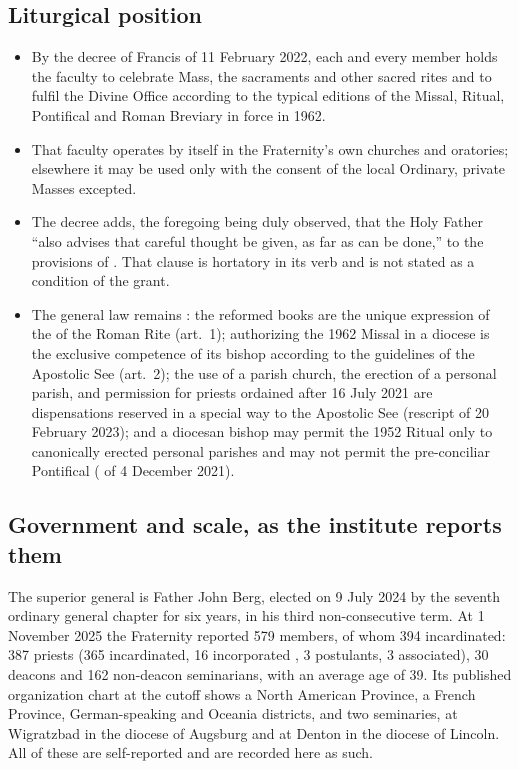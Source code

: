\subsection{Liturgical position}

\begin{itemize}
\item By the decree of Francis of 11 February 2022, each and every member
holds the faculty to celebrate Mass, the sacraments and other sacred
rites and to fulfil the Divine Office according to the typical editions
of the Missal, Ritual, Pontifical and Roman Breviary in force in 1962.
\item That faculty operates by itself in the Fraternity's own churches
and oratories; elsewhere it may be used only with the consent of the
local Ordinary, private Masses excepted.
\item The decree adds, the foregoing being duly observed, that the Holy
Father ``also advises that careful thought be given, as far as can be
done,'' to the provisions of . That clause is
hortatory in its verb and is not stated as a condition of the grant.
\item The general law remains : the reformed
books are the unique expression of the  of the Roman
Rite (art.~1); authorizing the 1962 Missal in a diocese is the exclusive
competence of its bishop according to the guidelines of the Apostolic See
(art.~2); the use of a parish church, the erection of a personal parish,
and permission for priests ordained after 16 July 2021 are dispensations
reserved in a special way to the Apostolic See (rescript of 20 February
2023); and a diocesan bishop may permit the 1952 Ritual only to
canonically erected personal parishes and may not permit the pre-conciliar
Pontifical ( of 4 December 2021).
\end{itemize}

\subsection{Government and scale, as the institute reports them}

The superior general is Father John Berg, elected on 9 July 2024 by the
seventh ordinary general chapter for six years, in his third
non-consecutive term. At 1 November 2025 the Fraternity reported 579
members, of whom 394 incardinated: 387 priests (365 incardinated, 16
incorporated , 3 postulants, 3 associated), 30 deacons and
162 non-deacon seminarians, with an average age of 39. Its published
organization chart at the cutoff shows a North American Province, a French
Province, German-speaking and Oceania districts, and two seminaries, at
Wigratzbad in the diocese of Augsburg and at Denton in the diocese of
Lincoln. All of these are self-reported and are recorded here as such.

